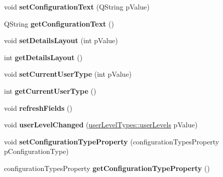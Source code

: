 \begin{DoxyCompactItemize}
\item 
\hypertarget{classQEConfiguredLayout_adddaf96a14b33d3185e5c49b5b802403}{
void {\bfseries setConfigurationText} (QString pValue)}
\label{classQEConfiguredLayout_adddaf96a14b33d3185e5c49b5b802403}

\item 
\hypertarget{classQEConfiguredLayout_a555c48337bd8c1c40a269e2540c83238}{
QString {\bfseries getConfigurationText} ()}
\label{classQEConfiguredLayout_a555c48337bd8c1c40a269e2540c83238}

\item 
\hypertarget{classQEConfiguredLayout_a8487913e904aaff92bbeb9f008244176}{
void {\bfseries setDetailsLayout} (int pValue)}
\label{classQEConfiguredLayout_a8487913e904aaff92bbeb9f008244176}

\item 
\hypertarget{classQEConfiguredLayout_a532154037091456995957ade4e7333dd}{
int {\bfseries getDetailsLayout} ()}
\label{classQEConfiguredLayout_a532154037091456995957ade4e7333dd}

\item 
\hypertarget{classQEConfiguredLayout_abdd591207dd36152821f8614742bc9e4}{
void {\bfseries setCurrentUserType} (int pValue)}
\label{classQEConfiguredLayout_abdd591207dd36152821f8614742bc9e4}

\item 
\hypertarget{classQEConfiguredLayout_aca1dcd9cd4a7a1d4e0212a5858cf8821}{
int {\bfseries getCurrentUserType} ()}
\label{classQEConfiguredLayout_aca1dcd9cd4a7a1d4e0212a5858cf8821}

\item 
\hypertarget{classQEConfiguredLayout_a4950954b0497b52b3618e6ae70f49c53}{
void {\bfseries refreshFields} ()}
\label{classQEConfiguredLayout_a4950954b0497b52b3618e6ae70f49c53}

\item 
\hypertarget{classQEConfiguredLayout_ac2e1703fa08f62879c9caaf67581d5ca}{
void {\bfseries userLevelChanged} (\hyperlink{classuserLevelTypes_a033cf2a40f620286b1839dd360c8497b}{userLevelTypes::userLevels} pValue)}
\label{classQEConfiguredLayout_ac2e1703fa08f62879c9caaf67581d5ca}

\item 
\hypertarget{classQEConfiguredLayout_a1473dc40d21ca96509039c582af4d5cf}{
void {\bfseries setConfigurationTypeProperty} (configurationTypesProperty pConfigurationType)}
\label{classQEConfiguredLayout_a1473dc40d21ca96509039c582af4d5cf}

\item 
\hypertarget{classQEConfiguredLayout_a7990daddd0865534e2231ccf7d566f89}{
configurationTypesProperty {\bfseries getConfigurationTypeProperty} ()}
\label{classQEConfiguredLayout_a7990daddd0865534e2231ccf7d566f89}


\end{DoxyCompactItemize}
